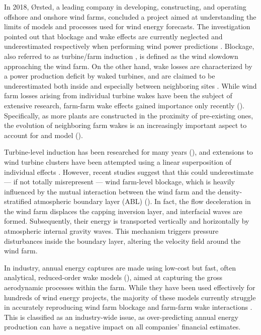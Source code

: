 \documentclass[journal abbreviation, manuscript]{copernicus}
\begin{document}
In 2018, Ørsted, a leading company in developing, constructing, and operating offshore and onshore wind farms, concluded a project aimed at understanding the limits of models and processes used for wind energy forecasts. The investigation pointed out that blockage and wake effects are currently neglected and underestimated respectively when performing wind power predictions \citep{2019_Orsted}. Blockage, also referred to as turbine/farm induction \citep{2018_BleegEtAl}, is defined as the wind slowdown approaching the wind farm. On the other hand, wake losses are characterized by a power production deficit by waked turbines, and are claimed to be underestimated both inside and especially between neighboring sites \citep{2022_Pedersen}. While wind farm losses arising from individual turbine wakes have been the subject of extensive research, farm-farm wake effects gained importance only recently (\citealp{2019_LundquistEtAl,2020_Ahsbahs, 2020_Schneemann}). Specifically, as more plants are constructed in the proximity of pre-existing ones, the evolution of neighboring farm wakes is an increasingly important aspect to account for and model (\citealp{2020_Nygaard}).

Turbine-level induction has been researched for many years (\citealp{2017_TroldborgForsting, 2019_GribbenHawkes, 2014_BranlardGaunaa, 2020_BranlardEtAl}), and extensions to wind turbine clusters have been attempted using a linear superposition of individual effects \citep{2020_BranlardForsting,2021_Segalini}. However, recent studies suggest that this could underestimate --- if not totally misrepresent --- wind farm-level blockage, which is heavily influenced by the mutual interaction between the wind farm and the density-stratified atmospheric boundary layer (ABL) (\citealp{2010_Smith, 2017_WuPorteAgel, 2017a_AllaertsMeyers, 2017b_AllaertsMayers, 2019_AllaertsMeyers, 2021_CenturelliEtAl}). In fact, the flow deceleration in the wind farm displaces the capping inversion layer, and interfacial waves are formed. Subsequently, their energy is transported vertically and horizontally by atmospheric internal gravity waves. This mechanism triggers pressure disturbances inside the boundary layer, altering the velocity field around the wind farm.

In industry, annual energy captures are made using low-cost but fast, often analytical, reduced-order wake models (\citealp{1983_Jensen, 1988_Ainslie, 1988_Larsen, 2014_Bastankhah, 2016_Niayifar}), aimed at capturing the gross aerodynamic processes within the farm. While they have been used effectively for hundreds of wind energy projects, the majority of these models currently struggle in accurately reproducing wind farm blockage and farm-farm wake interactions \citep{2022_Nygaard}. This is classified as an industry-wide issue, as over-predicting annual energy production can have a negative impact on all companies' financial estimates. 
\end{document}
